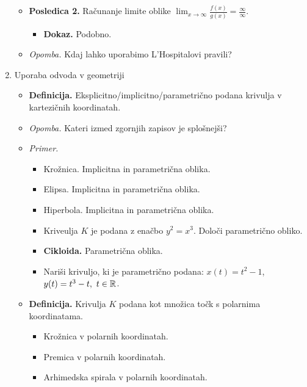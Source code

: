 \begin{enumerate}
\begin{itemize}
\begin{itemize}
        \end{itemize}
        \item \colorbox{orange!30}{\textbf{Posledica 2.}} Računanje limite oblike $\lim_{x \to \infty} \frac{f(x)}{g(x)} = \frac{\infty}{\infty}$.   
        \begin{itemize}
            \item \colorbox{green!30}{\textbf{Dokaz.}} Podobno.
        \end{itemize}
        \item \colorbox{yellow!30}{\emph{Opomba.}} Kdaj lahko uporabimo L'Hospitalovi pravili?
    \end{itemize}

    \newpage
    \item Uporaba odvoda v geometriji
    \begin{itemize}
        \item \colorbox{purple!30}{\textbf{Definicija.}} Eksplicitno/implicitno/parametrično podana krivulja v kartezičnih koordinatah.
        \item \colorbox{yellow!30}{\emph{Opomba.}} Kateri izmed zgornjih zapisov je splošnejši?
        \item \colorbox{yellow!30}{\emph{Primer.}}
        \begin{itemize}
            \item Krožnica. Implicitna in parametrična oblika.
            \item Elipsa. Implicitna in parametrična oblika.
            \item Hiperbola. Implicitna in parametrična oblika.
            \item Kriveulja $K$ je podana z enačbo $y^2 = x^3$. Določi parametrično obliko.
            \item \textbf{Cikloida.} Parametrična oblika.
            \item Nariši krivuljo, ki je parametrično podana: $x(t) = t^2 - 1$, $y(t) = t^3-t, \ t \in \mathbb{R}$.
        \end{itemize}
        \item \colorbox{purple!30}{\textbf{Definicija.}} Krivulja $K$ podana kot množica točk s polarnima koordinatama. 
        \begin{itemize}
            \item Krožnica v polarnih koordinatah.
            \item Premica v polarnih koordinatah.
            \item Arhimedska spirala v polarnih koordinatah.
        \end{itemize}

\end{itemize}
\end{enumerate}
